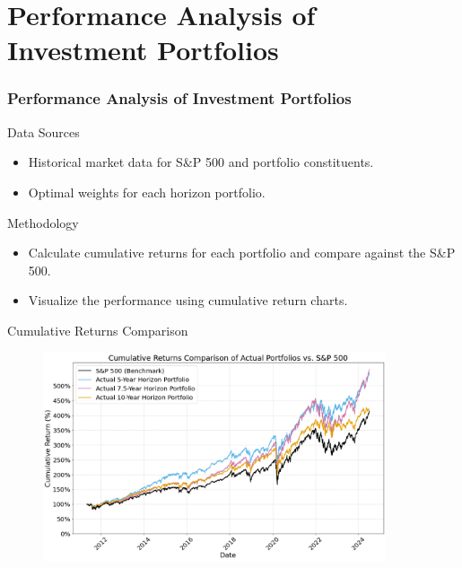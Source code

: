 \documentclass{beamer}
\begin{document}
\section{Performance Analysis of Investment Portfolios}
\begin{frame}
\frametitle{Performance Analysis of Investment Portfolios}
    \begin{block}{Data Sources}
        \begin{itemize}
            \item Historical market data for S\&P 500 and portfolio constituents.
            \item Optimal weights for each horizon portfolio.
        \end{itemize}
    \end{block}
    \begin{block}{Methodology}
        \begin{itemize}
            \item Calculate cumulative returns for each portfolio and compare against the S\&P 500.
            \item Visualize the performance using cumulative return charts.
        \end{itemize}
    \end{block}
\end{frame}


\begin{frame}{Cumulative Returns Comparison}
    \begin{figure}
        \centering
        \includegraphics[width=0.9\textwidth]{cumulative_returns_comparison.png}
    \end{figure}
\end{frame}
\end{document}
